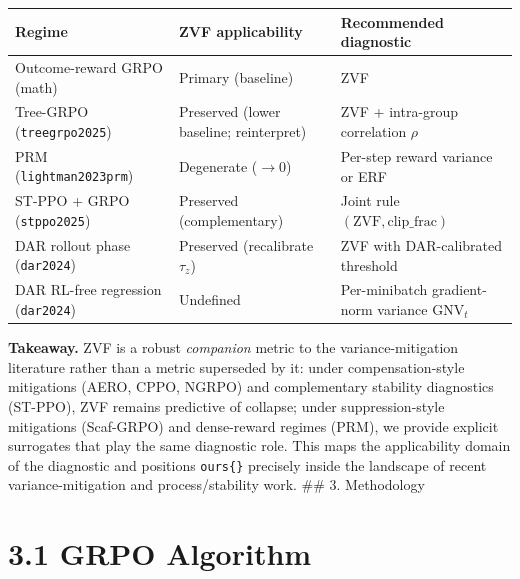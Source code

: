 \documentclass[
  american,
  11pt,
  a4paper,
  oneside]{report}
\newcounter{none} %
\begin{document}
{\def\LTcaptype{none} %
\begin{longtable}[]{@{}
  >{\raggedright\arraybackslash}p{}
  >{\raggedright\arraybackslash}p{}
  >{\raggedright\arraybackslash}p{}@{}}
\toprule\noalign{}
\begin{minipage}[b]{\linewidth}\raggedright
Regime
\end{minipage} & \begin{minipage}[b]{\linewidth}\raggedright
ZVF applicability
\end{minipage} & \begin{minipage}[b]{\linewidth}\raggedright
Recommended diagnostic
\end{minipage} \\
\midrule\noalign{}
\endhead
\bottomrule\noalign{}
\endlastfoot
Outcome-reward GRPO (math) & Primary (baseline) & ZVF \\
Tree-GRPO (\texttt{treegrpo2025}) & Preserved (lower baseline;
reinterpret) & ZVF + intra-group correlation \(\rho\) \\
PRM (\texttt{lightman2023prm}) & Degenerate (\(\to 0\)) & Per-step
reward variance or ERF \\
ST-PPO + GRPO (\texttt{stppo2025}) & Preserved (complementary) & Joint
rule \((\mathrm{ZVF}, \mathrm{clip\_frac})\) \\
DAR rollout phase (\texttt{dar2024}) & Preserved (recalibrate
\(\tau_z\)) & ZVF with DAR-calibrated threshold \\
DAR RL-free regression (\texttt{dar2024}) & Undefined & Per-minibatch
gradient-norm variance \(\mathrm{GNV}_t\) \\
\end{longtable}
}

\textbf{Takeaway.} ZVF is a robust \emph{companion} metric to the
variance-mitigation literature rather than a metric superseded by it:
under compensation-style mitigations (AERO, CPPO, NGRPO) and
complementary stability diagnostics (ST-PPO), ZVF remains predictive of
collapse; under suppression-style mitigations (Scaf-GRPO) and
dense-reward regimes (PRM), we provide explicit surrogates that play the
same diagnostic role. This maps the applicability domain of the
diagnostic and positions \texttt{ours\{\}} precisely inside the
landscape of recent variance-mitigation and process/stability work. \#\#
3. Methodology

\section{3.1 GRPO Algorithm}\label{grpo-algorithm}
\end{document}
